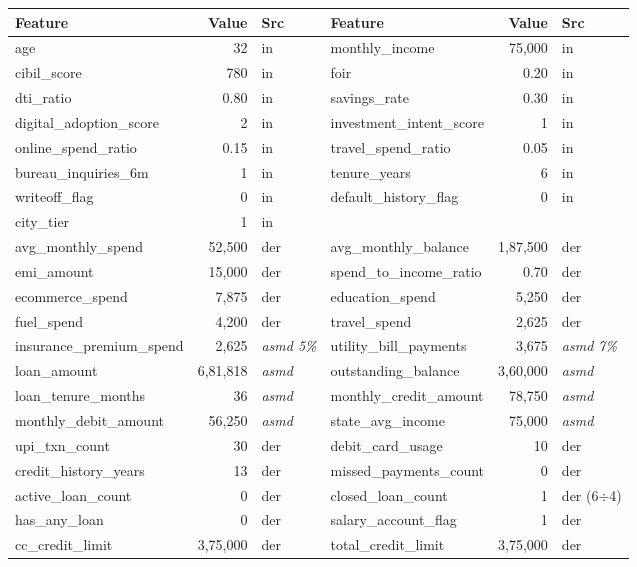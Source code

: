 \documentclass[12pt,a4paper]{article}
\begin{document}
\begin{longtable}{lrl|lrl}
\toprule
\textbf{Feature} & \textbf{Value} & \textbf{Src} & \textbf{Feature} & \textbf{Value} & \textbf{Src} \\
\midrule
\endhead
age & 32 & in & monthly\_income & 75{,}000 & in \\
cibil\_score & 780 & in & foir & 0.20 & in \\
dti\_ratio & 0.80 & in & savings\_rate & 0.30 & in \\
digital\_adoption\_score & 2 & in & investment\_intent\_score & 1 & in \\
online\_spend\_ratio & 0.15 & in & travel\_spend\_ratio & 0.05 & in \\
bureau\_inquiries\_6m & 1 & in & tenure\_years & 6 & in \\
writeoff\_flag & 0 & in & default\_history\_flag & 0 & in \\
city\_tier & 1 & in & & & \\
\midrule
avg\_monthly\_spend & 52{,}500 & der & avg\_monthly\_balance & 1{,}87{,}500 & der \\
emi\_amount & 15{,}000 & der & spend\_to\_income\_ratio & 0.70 & der \\
ecommerce\_spend & 7{,}875 & der & education\_spend & 5{,}250 & der \\
fuel\_spend & 4{,}200 & der & travel\_spend & 2{,}625 & der \\
insurance\_premium\_spend & 2{,}625 & \textit{asmd 5\%} & utility\_bill\_payments & 3{,}675 & \textit{asmd 7\%} \\
loan\_amount & 6{,}81{,}818 & \textit{asmd} & outstanding\_balance & 3{,}60{,}000 & \textit{asmd} \\
loan\_tenure\_months & 36 & \textit{asmd} & monthly\_credit\_amount & 78{,}750 & \textit{asmd} \\
monthly\_debit\_amount & 56{,}250 & \textit{asmd} & state\_avg\_income & 75{,}000 & \textit{asmd} \\
upi\_txn\_count & 30 & der & debit\_card\_usage & 10 & der \\
credit\_history\_years & 13 & der & missed\_payments\_count & 0 & der \\
active\_loan\_count & 0 & der & closed\_loan\_count & 1 & der (6$\div$4) \\
has\_any\_loan & 0 & der & salary\_account\_flag & 1 & der \\
\midrule
cc\_credit\_limit & 3{,}75{,}000 & der & total\_credit\_limit & 3{,}75{,}000 & der \\

\end{longtable}
\end{document}
